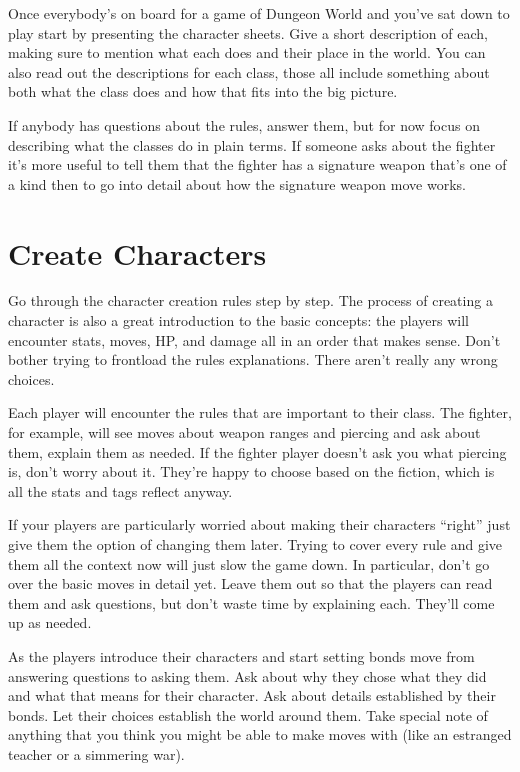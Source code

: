 Once everybody's on board for a game of Dungeon World and you've sat down to play start by presenting the character sheets. Give a short description of each, making sure to mention what each does and their place in the world. You can also read out the descriptions for each class, those all include something about both what the class does and how that fits into the big picture.


 If anybody has questions about the rules, answer them, but for now focus on describing what the classes do in plain terms. If someone asks about the fighter it's more useful to tell them that the fighter has a signature weapon that's one of a kind then to go into detail about how the signature weapon move works.
\section{Create Characters}


 Go through the character creation rules step by step. The process of creating a character is also a great introduction to the basic concepts: the players will encounter stats, moves, HP, and damage all in an order that makes sense. Don't bother trying to frontload the rules explanations. There aren't really any wrong choices.


 Each player will encounter the rules that are important to their class. The fighter, for example, will see moves about weapon ranges and piercing and ask about them, explain them as needed. If the fighter player doesn't ask you what piercing is, don't worry about it. They're happy to choose based on the fiction, which is all the stats and tags reflect anyway.


 If your players are particularly worried about making their characters ``right'' just give them the option of changing them later. Trying to cover every rule and give them all the context now will just slow the game down. In particular, don't go over the basic moves in detail yet. Leave them out so that the players can read them and ask questions, but don't waste time by explaining each. They'll come up as needed.


 As the players introduce their characters and start setting bonds move from answering questions to asking them. Ask about why they chose what they did and what that means for their character. Ask about details established by their bonds. Let their choices establish the world around them. Take special note of anything that you think you might be able to make moves with (like an estranged teacher or a simmering war).
